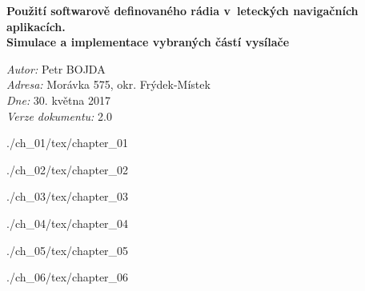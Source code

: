 \documentclass[twoside,11pt]{article}
\begin{document}
\begin{titlepage}



\center %






{ \huge \bfseries Použití softwarově definovaného rádia v~leteckých navigačních aplikacích.}\\[2in] %
\fontsize{17}{12}\textbf{\textcolor{bgr_DarkBlue}{Simulace a implementace vybraných částí vysílače}}\\[4in]
        
\begin{minipage}{0.9\textwidth}
\begin{flushleft} \large
\emph{Autor:} Petr \textsc{BOJDA}\\

\emph{Adresa:} Morávka 575, okr. Frýdek-Místek\\
\emph{Dne:} 30. května 2017\\%
\emph{Verze dokumentu:} 2.0
\end{flushleft}
\end{minipage}


\end{titlepage}

 {./ch_01/tex/chapter_01}

 {./ch_02/tex/chapter_02}

 {./ch_03/tex/chapter_03}

 {./ch_04/tex/chapter_04}


 {./ch_05/tex/chapter_05}


 {./ch_06/tex/chapter_06}





\end{document}
